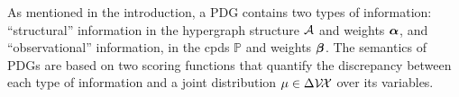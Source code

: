 As mentioned in the introduction, a PDG contains two types of information:
``structural'' information in the hypergraph structure $\mathcal A$ and
weights $\boldsymbol\alpha$, and ``observational'' information, 
in the cpds 
$\mathbb P$ and weights $\boldsymbol\beta$.
The semantics of PDGs are based on two scoring functions
that quantify the discrepancy between 
each type of information and a joint distribution
$\mu \in \Delta \mathcal V \!\mathcal X$ over its variables.

